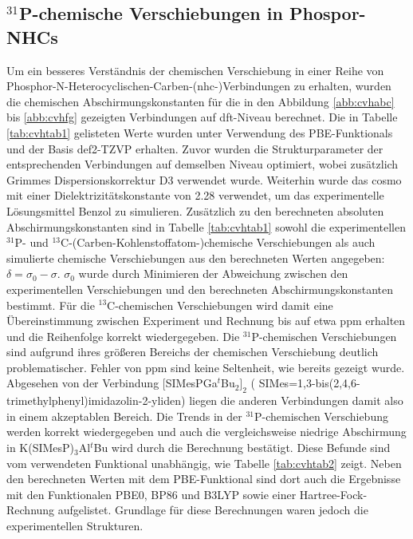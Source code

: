 \subsection{\texorpdfstring{$^{31}$P}{31P}-chemische Verschiebungen in Phospor-NHCs}
Um ein besseres Verständnis der chemischen Verschiebung in einer Reihe von Phosphor-N-Heterocyclischen-Carben-(\acs{nhc}-)Verbindungen \supercite{lemp2017nhc} zu erhalten, wurden die chemischen Abschirmungskonstanten für die in den Abbildung \ref{abb:cvhabc} bis \ref{abb:cvhfg} gezeigten Verbindungen auf \ac{dft}-Niveau berechnet. Die in Tabelle \ref{tab:cvhtab1} gelisteten Werte wurden unter Verwendung des PBE-Funktionals\supercite{perdew1996generalized} und der Basis def2-TZVP\supercite{weigend2005balanced} erhalten. Zuvor wurden die Strukturparameter der entsprechenden Verbindungen auf demselben Niveau optimiert, wobei zusätzlich Grimmes Dispersionskorrektur D3\supercite{grimme2010consistent,grimme2011effect} verwendet wurde. Weiterhin wurde das \ac{cosmo}\supercite{klamt1993cosmo} mit einer Dielektrizitätskonstante von 2.28 verwendet, um das experimentelle Lösungsmittel Benzol zu simulieren. Zusätzlich zu den berechneten absoluten Abschirmungskonstanten sind in Tabelle \ref{tab:cvhtab1} sowohl die experimentellen $^{31}$P- und $^{13}$C-(Carben-Kohlenstoffatom-)chemische Verschiebungen als auch simulierte chemische Verschiebungen aus den berechneten Werten angegeben: $\delta=\sigma_0-\sigma$. $\sigma_0$ wurde durch Minimieren der Abweichung zwischen den experimentellen Verschiebungen und den berechneten Abschirmungskonstanten bestimmt. Für die $^{13}$C-chemischen Verschiebungen wird damit eine Übereinstimmung zwischen Experiment und Rechnung bis auf etwa \unit[2]{ppm} erhalten und die Reihenfolge korrekt wiedergegeben. Die $^{31}$P-chemischen Verschiebungen sind aufgrund ihres größeren Bereichs der chemischen Verschiebung deutlich problematischer. Fehler von \unit[30]{ppm} sind keine Seltenheit, wie bereits gezeigt wurde.\supercite{latypov2015quantum,reiter2017calculation} Abgesehen von der Verbindung $[$SIMesPGa$^\textit{t}$Bu$_2]_2$ ( SIMes=1,3-bis(2,4,6-tri\-me\-thyl\-phe\-nyl)imi\-da\-zo\-lin-2-yli\-den) liegen die anderen Verbindungen damit also in einem akzeptablen Bereich. Die Trends in der $^{31}$P-chemischen Verschiebung werden korrekt wiedergegeben und auch die vergleichsweise niedrige Abschirmung in K(SIMesP)$_3$Al$^\textit{t}$Bu wird durch die Berechnung bestätigt. Diese Befunde sind vom verwendeten Funktional unabhängig, wie Tabelle \ref{tab:cvhtab2} zeigt. Neben den berechneten Werten mit dem PBE-Funktional sind dort auch die Ergebnisse mit den Funktionalen PBE0\supercite{adamo1999toward}, BP86\supercite{perdew1986density,becke1988density} und B3LYP\supercite{becke1993density,lee1988development,stephens1994ab} sowie einer Hartree-Fock-Rechnung aufgelistet. Grundlage für diese Berechnungen waren jedoch die experimentellen Strukturen.

